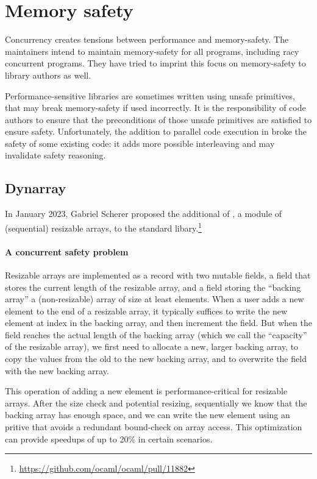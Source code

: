 \section{Memory safety}

Concurrency creates tensions between performance and memory-safety. The \OCaml maintainers intend to maintain memory-safety for all \OCaml programs, including racy concurrent programs. They have tried to imprint this focus on memory-safety to library authors as well.

Performance-sensitive \OCaml libraries are sometimes written using unsafe primitives, that may break memory-safety if used incorrectly. It is the responsibility of code authors to ensure that the preconditions of those unsafe primitives are satisfied to ensure safety. Unfortunately, the addition to parallel code execution in \OCamlFive broke the safety of some existing code: it adds more possible interleaving and may invalidate safety reasoning.

\subsection{Dynarray} In January 2023, Gabriel Scherer proposed the additional of , a module of (sequential) resizable arrays, to the \OCaml standard libary.\footnote{\url{https://github.com/ocaml/ocaml/pull/11882}} 

\paragraph{A concurrent safety problem}

Resizable arrays are implemented as a record with two mutable fields, a  field that stores the current length of the resizable array, and a  field storing the ``backing array'' a (non-resizable) array of size at least  elements. When a user adds a new element to the end of a resizable array, it typically suffices to write the new element at index  in the backing array, and then increment the  field. But when the  field reaches the actual length of the backing array (which we call the ``capacity'' of the resizable array), we first need to allocate a new, larger backing array, to copy the values from the old to the new backing array, and to overwrite the  field with the new backing array.

This operation of adding a new element is performance-critical for resizable arrays. After the size check and potential resizing, sequentially we know that the backing array has enough space, and we can write the new element using an  pritive that avoids a redundant bound-check on array access. This optimization can provide speedups of up to 20\% in certain scenarios.

